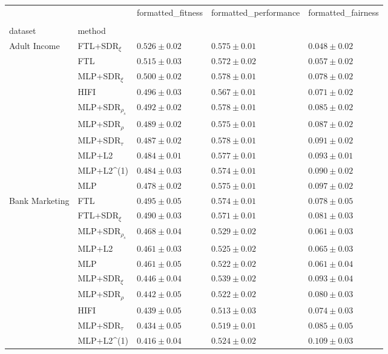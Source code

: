\begin{tabular}{lllll}
\toprule
 &  & formatted_fitness & formatted_performance & formatted_fairness \\
 &  &  &  &  \\
dataset & method &  &  &  \\
\midrule
\multirow[t]{10}{*}{Adult Income} & FTL+SDR$_{\xi}$ & $0.526 \pm0.02$ & $0.575 \pm0.01$ & $0.048 \pm0.02$ \\
 & FTL & $0.515 \pm0.03$ & $0.572 \pm0.02$ & $0.057 \pm0.02$ \\
 & MLP+SDR$_{\xi}$ & $0.500 \pm0.02$ & $0.578 \pm0.01$ & $0.078 \pm0.02$ \\
 & HIFI & $0.496 \pm0.03$ & $0.567 \pm0.01$ & $0.071 \pm0.02$ \\
 & MLP+SDR$_{\rho_s}$ & $0.492 \pm0.02$ & $0.578 \pm0.01$ & $0.085 \pm0.02$ \\
 & MLP+SDR$_{\rho}$ & $0.489 \pm0.02$ & $0.575 \pm0.01$ & $0.087 \pm0.02$ \\
 & MLP+SDR$_{\tau}$ & $0.487 \pm0.02$ & $0.578 \pm0.01$ & $0.091 \pm0.02$ \\
 & MLP+L2 & $0.484 \pm0.01$ & $0.577 \pm0.01$ & $0.093 \pm0.01$ \\
 & MLP+L2^{(1)} & $0.484 \pm0.03$ & $0.574 \pm0.01$ & $0.090 \pm0.02$ \\
 & MLP & $0.478 \pm0.02$ & $0.575 \pm0.01$ & $0.097 \pm0.02$ \\
\cline{1-5}
\multirow[t]{10}{*}{Bank Marketing} & FTL & $0.495 \pm0.05$ & $0.574 \pm0.01$ & $0.078 \pm0.05$ \\
 & FTL+SDR$_{\xi}$ & $0.490 \pm0.03$ & $0.571 \pm0.01$ & $0.081 \pm0.03$ \\
 & MLP+SDR$_{\rho_s}$ & $0.468 \pm0.04$ & $0.529 \pm0.02$ & $0.061 \pm0.03$ \\
 & MLP+L2 & $0.461 \pm0.03$ & $0.525 \pm0.02$ & $0.065 \pm0.03$ \\
 & MLP & $0.461 \pm0.05$ & $0.522 \pm0.02$ & $0.061 \pm0.04$ \\
 & MLP+SDR$_{\xi}$ & $0.446 \pm0.04$ & $0.539 \pm0.02$ & $0.093 \pm0.04$ \\
 & MLP+SDR$_{\rho}$ & $0.442 \pm0.05$ & $0.522 \pm0.02$ & $0.080 \pm0.03$ \\
 & HIFI & $0.439 \pm0.05$ & $0.513 \pm0.03$ & $0.074 \pm0.03$ \\
 & MLP+SDR$_{\tau}$ & $0.434 \pm0.05$ & $0.519 \pm0.01$ & $0.085 \pm0.05$ \\
 & MLP+L2^{(1)} & $0.416 \pm0.04$ & $0.524 \pm0.02$ & $0.109 \pm0.03$ \\

\end{tabular}
